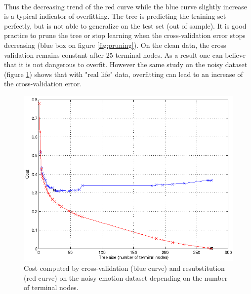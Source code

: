 \documentclass[a4paper,12pt,oneside,final]{report}
\begin{document}
\paragraph{}
Thus the decreasing trend of the red curve while the blue curve slightly increase is a typical indicator of overfitting. The tree is predicting the training set perfectly, but is not able to generalize on the test set (out of sample). It is good practice to prune the tree or stop learning when the cross-validation error stops decreasing (blue box on figure \ref{fig:pruning}). On the clean data, the cross validation remains constant after 25 terminal nodes. As a result one can believe that it is not dangerous to overfit. However the same study on the noisy dataset (figure \ref{fig:pruning_noisy}) shows that with "real life" data, overfitting can lead to an increase of the cross-validation error.
\begin{figure}[!h]
\center
\includegraphics{pruning_example_noisy.png}
\caption[Pruning example on noisy data.]{Cost computed by cross-validation (blue curve) and resubstitution (red curve) on the noisy emotion dataset depending on the number of terminal nodes. \label{fig:pruning_noisy}}
\end{figure}
\end{document}
